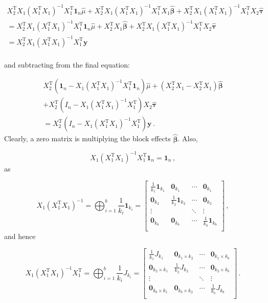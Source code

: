 \documentclass[
]{book}
\theoremstyle{definition}
\theoremstyle{definition}
\theoremstyle{definition}
\theoremstyle{definition}
\theoremstyle{remark}
\begin{document}
\begin{multline}
X_2^{\mathrm{T}}X_1(X_1^{\mathrm{T}}X_1)^{-1}X_1^{\mathrm{T}}\boldsymbol{1}_n\hat{\mu} + X_2^{\mathrm{T}}X_1(X_1^{\mathrm{T}}X_1)^{-1}X_1^{\mathrm{T}}X_1\hat{\boldsymbol{\beta}} + X_2^{\mathrm{T}}X_1(X_1^{\mathrm{T}}X_1)^{-1}X_1^{\mathrm{T}}X_2\hat{\boldsymbol{\tau}} \\
 = X_2^{\mathrm{T}}X_1(X_1^{\mathrm{T}}X_1)^{-1}X_1^{\mathrm{T}}\boldsymbol{1}_n\hat{\mu} + X_2^{\mathrm{T}}X_1\hat{\boldsymbol{\beta}} + X_2^{\mathrm{T}}X_1(X_1^{\mathrm{T}}X_1)^{-1}X_1^{\mathrm{T}}X_2\hat{\boldsymbol{\tau}} \\
 = X_2^{\mathrm{T}}X_1(X_1^{\mathrm{T}}X_1)^{-1}X_1^{\mathrm{T}}\boldsymbol{y}\\
\end{multline}

and subtracting from the final equation:

\begin{multline}
X_2^{\mathrm{T}}\left(\boldsymbol{1}_n - X_1(X_1^{\mathrm{T}}X_1)^{-1}X_1^{\mathrm{T}}\boldsymbol{1}_n\right)\hat{\mu} + \left(X_2^{\mathrm{T}}X_1 - X_2^{\mathrm{T}}X_1\right)\hat{\boldsymbol{\beta}} \\ + X_2^{\mathrm{T}}\left(I_n - X_1(X_1^{\mathrm{T}}X_1)^{-1}X_1^{\mathrm{T}}\right)X_2\hat{\boldsymbol{\tau}}\\
= X_2^{\mathrm{T}}\left(I_n - X_1(X_1^{\mathrm{T}}X_1)^{-1}X_1^{\mathrm{T}}\right)\boldsymbol{y}\,.
\end{multline}
Clearly, a zero matrix is multiplying the block effects \(\hat{\boldsymbol{\beta}}\). Also,

\[
X_1(X_1^{\mathrm{T}}X_1)^{-1}X_1^{\mathrm{T}}\boldsymbol{1}_n = \boldsymbol{1}_n\,,
\]
as

\[
X_1(X_1^{\mathrm{T}}X_1)^{-1} = \bigoplus_{i = 1}^b \frac{1}{k_i}\boldsymbol{1}_{k_i} = \begin{bmatrix}
\frac{1}{k_1}\boldsymbol{1}_{k_1} & \boldsymbol{0}_{k_1} & \cdots &  \boldsymbol{0}_{k_1} \\
\boldsymbol{0}_{k_2} & \frac{1}{k_2}\boldsymbol{1}_{k_2} & \cdots &  \boldsymbol{0}_{k_2} \\
\vdots & & \ddots & \vdots \\
\boldsymbol{0}_{k_b} & \boldsymbol{0}_{k_b} & \cdots &  \frac{1}{k_b}\boldsymbol{1}_{k_b} \\
\end{bmatrix}\,,
\]
and hence

\[
X_1(X_1^{\mathrm{T}}X_1)^{-1}X_1^{\mathrm{T}} = \bigoplus_{i = 1}^b \frac{1}{k_i}J_{k_i} = \begin{bmatrix}
\frac{1}{k_1}J_{k_1} & \boldsymbol{0}_{k_1\times k_2} & \cdots &  \boldsymbol{0}_{k_1\times k_b} \\
\boldsymbol{0}_{k_2\times k_1} & \frac{1}{k_2}J_{k_2} & \cdots &  \boldsymbol{0}_{k_2\times k_b} \\
\vdots & & \ddots & \vdots \\
\boldsymbol{0}_{k_b\times k_1} & \boldsymbol{0}_{k_b\times k_2} & \cdots &  \frac{1}{k_b}J_{k_b} \\
\end{bmatrix}\,.
\]
\end{document}
